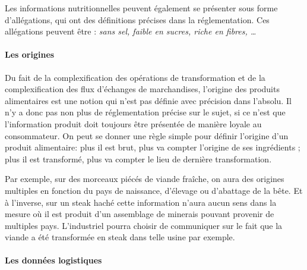                 Les informations nutritionnelles peuvent également se présenter sous forme d'allégations, qui ont des définitions précises dans la réglementation. Ces allégations peuvent être : \emph{sans sel, faible en sucres, riche en fibres, \dots}

                \paragraph{Les origines}

                Du fait de la complexification des opérations de transformation et de la complexification des flux d'échanges de marchandises, l'origine des produits alimentaires est une notion qui n'est pas définie avec précision dans l'absolu.
                Il n'y a donc pas non plus de réglementation précise sur le sujet, si ce n'est que l'information produit doit toujours être présentée de manière loyale au consommateur.
                On peut se donner une règle simple pour définir l'origine d'un produit alimentaire: plus il est brut, plus va compter l'origine de ses ingrédients ; plus il est transformé, plus va compter le lieu de dernière transformation.

                Par exemple, sur des morceaux piécés de viande fraîche, on aura des origines multiples en fonction du pays de naissance, d'élevage ou d'abattage de la bête.
                Et à l'inverse, sur un steak haché cette information n'aura aucun sens dans la mesure où il est produit d'un assemblage de \og minerais \fg pouvant provenir de multiples pays.
                L'industriel pourra choisir de communiquer sur le fait que la viande a été transformée en steak dans telle usine par exemple.

                \paragraph{Les données logistiques} 


